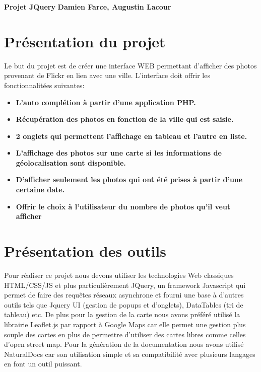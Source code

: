 \documentclass[a4paper, 11pt]{article}
\begin{document}
\large\textbf{Projet JQuery}  \textbf{Damien Farce, Augustin Lacour}

\section*{Présentation du projet}
Le but du projet est de créer une interface WEB permettant d'afficher des photos provenant de Flickr en lien avec une ville. L'interface doit offrir les fonctionnalitées suivantes:
\newline
\begin{itemize}
    \item \textbf{L'auto complétion à partir d'une application PHP.}
    \item \textbf{Récupération des photos en fonction de la ville qui est saisie.}
    \item \textbf{2 onglets qui permettent l'affichage en tableau et l'autre en liste.}
    \item \textbf{L'affichage des photos sur une carte si les informations de géolocalisation sont disponible.}
    \item \textbf{D'afficher seulement les photos qui ont été prises à partir d'une certaine date. }
    \item \textbf{Offrir le choix à l'utilisateur du nombre de photos qu'il veut afficher}
\end{itemize}

\section*{Présentation des outils}
Pour réaliser ce projet nous devons utiliser les technologies Web classiques HTML/CSS/JS et plus particulièrement JQuery, un framework Javascript qui permet de faire des requêtes réseaux asynchrone et fourni une base à d'autres outils tels que Jquery UI (gestion de popups et d'onglets), DataTables (tri de tableau) etc. 
\newline
\newline
De plus pour la gestion de la carte nous avons préféré utilisé la librairie Leaflet.js par rapport à Google Maps car elle permet une gestion plus souple des cartes en plus de permettre d'utiliser des cartes libres comme celles d'open street map.
\newline
\newline
Pour la génération de la documentation nous avons utilisé NaturalDocs car son utilisation simple et sa compatibilité avec plusieurs langages en font un outil puissant. 
\end{document}
